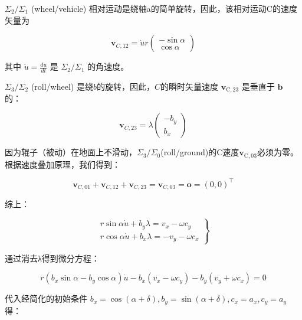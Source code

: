 $\Sigma_{2} / \Sigma_{1}$ (wheel/vehicle) 相对运动是绕轴a的简单旋转，因此，该相对运动C的速度矢量为


\begin{equation}
    \mathbf{v}_{C, 12}=\dot{u} r\left(\begin{array}{c}
    {-\sin \alpha} \\
    {\cos \alpha}
    \end{array}\right)
\end{equation}

其中 $\dot{u}=\frac{d u}{d t}$ 是 $\Sigma_{2} / \Sigma_{1}$ 的角速度。

$\Sigma_{3} / \Sigma_{2}$ (roll/wheel) 是绕$b$的旋转，因此，$C$的瞬时矢量速度 $\mathbf{v}_{\mathrm{C}, 23}$ 是垂直于 $\mathbf{b}$ 的：

\begin{equation}
\mathbf{v}_{C, 23}=\lambda\left(\begin{array}{c}
{-b_{y}} \\
{b_{x}}
\end{array}\right)
\end{equation}

因为辊子（被动）在地面上不滑动，$\Sigma_{3} / \Sigma_{0}$(roll/ground)的C速度$\mathbf{v}_{\mathrm{C}, 03}$必须为零。根据速度叠加原理，我们得到：

\begin{equation}
    \mathbf{v}_{C, 01}+\mathbf{v}_{C, 12}+\mathbf{v}_{C, 23}=\mathbf{v}_{C, 03}=\mathbf{o}=(0,0)^{\top}
\end{equation}

综上：

\begin{equation}
    \left.\begin{array}{l}
    {r \sin \alpha \dot{u}+b_{y} \lambda=v_{x}-\omega c_{y}} \\
    {r \cos \alpha \dot{u}+b_{x} \lambda=-v_{y}-\omega c_{x}}
    \end{array}\right\}
\end{equation}

通过消去λ得到微分方程：

\begin{equation}
    r\left(b_{x} \sin \alpha-b_{y} \cos \alpha\right) \dot{u}-b_{x}\left(v_{x}-\omega c_{y}\right)-b_{y}\left(v_{y}+\omega c_{x}\right)=0
\end{equation}

代入经简化的初始条件 $b_{x}=\cos (\alpha+\delta), b_{y}=\sin (\alpha+\delta), c_{x}=a_{x}, c_{y}=a_{y}$ 得：

